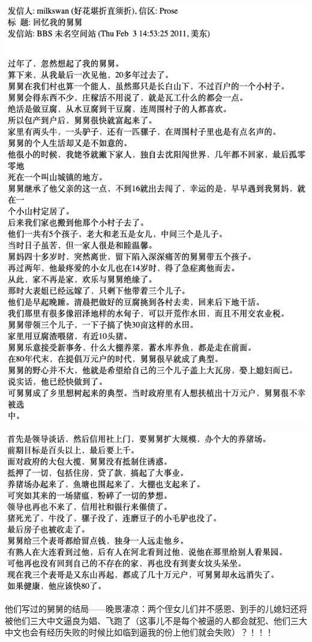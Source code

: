 \documentclass[9pt, b5paper]{article}
\begin{document}
\begin{center}
\includegraphics[width=.9\linewidth]{./pic/readme_20210520_095645.png}
\end{center}

\begin{center}
\includegraphics[width=.9\linewidth]{./pic/readme_20210520_095719.png}
\end{center}

他们写过的舅舅的结局——晚景凄凉：两个侄女儿们并不感恩、到手的儿媳妇还将被他们三大中文逼良为娼、飞跑了（这事儿不是每个被逼的人都会就犯、他们三大中文也会有经历失败的时候比如临到逼我的份上他们就会失败）？！！！
\end{document}
